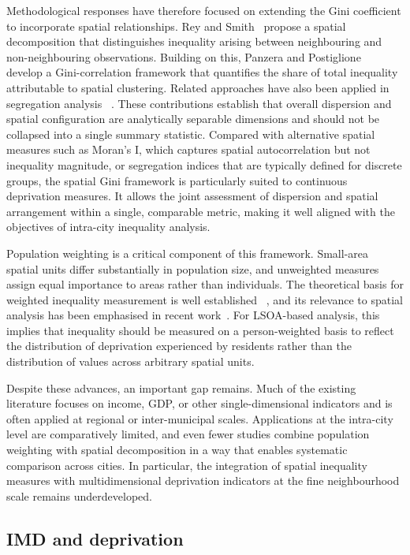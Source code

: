 \documentclass[11pt,journal,compsoc]{IEEEtran}
\begin{document}
Methodological responses have therefore focused on extending the Gini coefficient to incorporate spatial relationships. Rey and Smith~\cite{rey2013spatial} propose a spatial decomposition that distinguishes inequality arising between neighbouring and non-neighbouring observations. Building on this, Panzera and Postiglione~\cite{panzera2020measuring} develop a Gini-correlation framework that quantifies the share of total inequality attributable to spatial clustering. Related approaches have also been applied in segregation analysis ~\cite{turk2023introducing}. These contributions establish that overall dispersion and spatial configuration are analytically separable dimensions and should not be collapsed into a single summary statistic. Compared with alternative spatial measures such as Moran's I, which captures spatial autocorrelation but not inequality magnitude, or segregation indices that are typically defined for discrete groups, the spatial Gini framework is particularly suited to continuous deprivation measures. It allows the joint assessment of dispersion and spatial arrangement within a single, comparable metric, making it well aligned with the objectives of intra-city inequality analysis.

Population weighting is a critical component of this framework. Small-area spatial units differ substantially in population size, and unweighted measures assign equal importance to areas rather than individuals. The theoretical basis for weighted inequality measurement is well established ~\cite{mookherjee1982decomposition}, and its relevance to spatial analysis has been emphasised in recent work~\cite{panzera2020measuring}. For LSOA-based analysis, this implies that inequality should be measured on a person-weighted basis to reflect the distribution of deprivation experienced by residents rather than the distribution of values across arbitrary spatial units.

Despite these advances, an important gap remains. Much of the existing literature focuses on income, GDP, or other single-dimensional indicators and is often applied at regional or inter-municipal scales. Applications at the intra-city level are comparatively limited, and even fewer studies combine population weighting with spatial decomposition in a way that enables systematic comparison across cities. In particular, the integration of spatial inequality measures with multidimensional deprivation indicators at the fine neighbourhood scale remains underdeveloped.

\subsection{IMD and deprivation}
\end{document}
